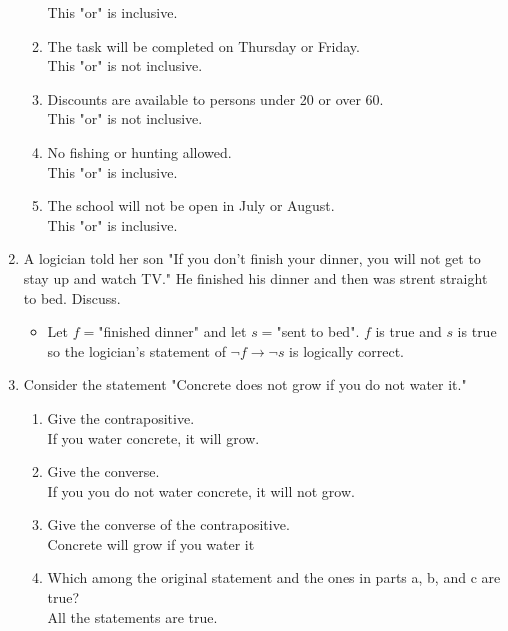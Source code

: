 \documentclass{article}
\begin{document}
\begin{enumerate}
\begin{enumerate}
	This "or" is inclusive.
	\item The task will be completed on Thursday or Friday.\\
	This "or" is not inclusive.
	\item Discounts are available to persons under 20 or over 60.\\
	This "or" is not inclusive.
	\item No fishing or hunting allowed.\\
	This "or" is inclusive.
	\item The school will not be open in July or August.\\
	This "or" is inclusive.
	\end{enumerate}
\setcounter{enumi}{22}
\item A logician told her son "If you don't finish your dinner, you will not get to 
stay up and watch TV." He finished his dinner and then was strent straight to bed. Discuss.
	\begin{itemize}
	\item Let $f=$"finished dinner" and let $s=$"sent to bed". $f$ is true and $s$ is true 
	so the logician's statement of $\neg f\to\neg s$ is logically correct.
	\end{itemize}
\item Consider the statement "Concrete does not grow if you do not water it."
	\begin{enumerate}
	\item Give the contrapositive.\\
	If you water concrete, it will grow.
	\item Give the converse.\\
	If you you do not water concrete, it will not grow.
	\item Give the converse of the contrapositive.\\
	Concrete will grow if you water it
	\item Which among the original statement and the ones in parts a, b, and c are true?\\
	All the statements are true.
	\end{enumerate}
\end{enumerate}
\end{document}
